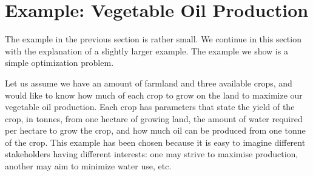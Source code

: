 \documentclass[a4paper]{article}
\begin{document}
\section{Example: Vegetable Oil Production}

The example in the previous section is rather small. We continue in this section
with the explanation of a slightly larger example. The example we show is a
simple optimization problem.

Let us assume we have an amount of farmland and three available crops, and would
like to know how much of each crop to grow on the land to maximize our vegetable
oil production. Each crop has parameters that state the yield of the crop, in
tonnes, from one hectare of growing land, the amount of water required per
hectare to grow the crop, and how much oil can be produced from one tonne of the
crop.
%
This example has been chosen because it is easy to imagine different
stakeholders having different interests: one may strive to maximise
production, another may aim to minimize water use, etc.
\end{document}
